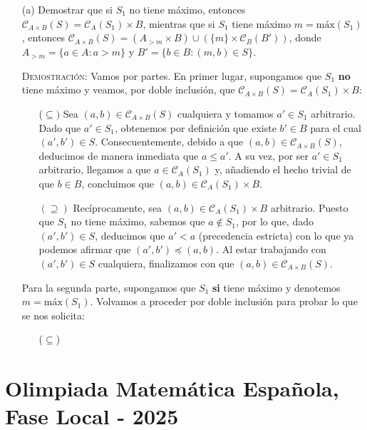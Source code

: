 \documentclass{article}
\begin{document}
\begin{itemize}
    \item[(a)] Demostrar que si $S_1$ no tiene máximo, entonces $\mathcal{C}_{A \times B}(S) = \mathcal{C}_A(S_1) \times B$, mientras que si
    $S_1$ tiene máximo $m = \text{máx}(S_1)$, entonces $\mathcal{C}_{A \times B}(S) = (A_{>m} \times B) \cup (\{m\} \times \mathcal{C}_B(B'))$, donde 
    $A_{>m} = \{a \in A : a > m\}$ y $B' = \{b \in B : (m, b) \in S\}$.

    \textsc{Demostración:} Vamos por partes. En primer lugar, supongamos que $S_1$ \textbf{no} tiene máximo y veamos, por doble inclusión, que $\mathcal{C}_{A \times B}(S) = \mathcal{C}_A(S_1) \times B$:

    \begin{itemize}
        \item[($\subseteq)$] Sea $(a, b) \in \mathcal{C}_{A \times B}(S)$ cualquiera y tomamos $a' \in S_1$ arbitrario. Dado que $a' \in S_1$, obtenemos por definición que existe $b' \in B$ para el cual $(a', b') \in S$.
        Consecuentemente, debido a que $(a, b) \in \mathcal{C}_{A \times B}(S)$, deducimos de manera inmediata que $a \leq a'$. A su vez, por ser $a' \in S_1$ arbitrario, llegamos a que $a \in \mathcal{C}_A(S_1)$ y, añadiendo el 
        hecho trivial de que $b \in B$, concluimos que $(a, b) \in \mathcal{C}_A(S_1) \times B$.

        \item[$(\supseteq)$] Recíprocamente, sea $(a, b) \in \mathcal{C}_A(S_1) \times B$ arbitrario. Puesto que $S_1$ no tiene máximo, sabemos que $a \notin S_1$, por lo que, dado $(a', b') \in S$, deducimos que $a' < a$ (precedencia estricta) con lo que 
        ya podemos afirmar que $(a', b') \preceq (a, b)$. Al estar trabajando con $(a', b') \in S$ cualquiera, finalizamos con que $(a, b) \in \mathcal{C}_{A \times B}(S)$.
    \end{itemize}

    Para la segunda parte, supongamos que $S_1$ \textbf{si} tiene máximo y denotemos $m = \text{máx}(S_1)$. Volvamos a proceder por doble inclusión para probar lo que se nos solicita:

    \begin{itemize}
        \item[($\subseteq$)] 
    \end{itemize}
\end{itemize}

\newpage

\section{Olimpiada Matemática Española, Fase Local - 2025}
\end{document}
